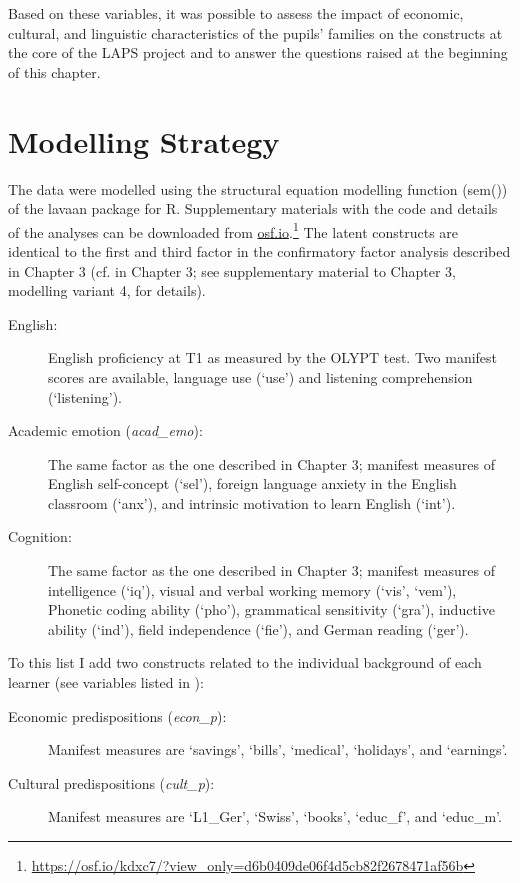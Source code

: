 \documentclass[output=paper]{langsci/langscibook}
\begin{document}
Based on these variables, it was possible to assess the impact of economic, cultural, and linguistic characteristics of the pupils’ families on the constructs at the core of the LAPS project and to answer the questions raised at the beginning of this chapter. 

\section{Modelling Strategy}

The data were modelled using the structural equation modelling function (sem()) of the lavaan package \citep{Rosseel2012} for R. Supplementary materials with the code and details of the analyses can be downloaded from \url{osf.io}.\footnote{\url{https://osf.io/kdxc7/?view_only=d6b0409de06f4d5cb82f2678471af56b}} The latent constructs are identical to the first and third factor in the confirmatory factor analysis described in Chapter 3 (cf.  in Chapter 3; see supplementary material to Chapter 3, modelling variant 4, for details). 

\begin{description}
\item[English:] English proficiency at T1 as measured by the OLYPT test. Two manifest scores are available, language use (‘use’) and listening comprehension (‘listening’).
\item[Academic emotion (\textit{acad\_emo}):] The same factor as the one described in Chapter 3; manifest measures of English self-concept (‘sel’), foreign language anxiety in the English classroom (‘anx’), and intrinsic motivation to learn English (‘int’).
\item[Cognition:] The same factor as the one described in Chapter 3; manifest measures of intelligence (‘iq’), visual and verbal working memory (‘vis’, ‘vem’), Phonetic coding ability (‘pho’), grammatical sensitivity (‘gra’), inductive ability (‘ind’), field independence (‘fie’), and German reading (‘ger’).
\end{description}

To this list I add two constructs related to the individual background of each learner (see variables listed in ):

\begin{description}
\item[Economic predispositions (\textit{econ\_p}):] Manifest measures are ‘savings’, ‘bills’, ‘medical’, ‘holidays’, and ‘earnings’.
\item[Cultural predispositions (\textit{cult\_p}):] Manifest measures are ‘L1\_Ger’, ‘Swiss’, ‘books’, ‘educ\_f’, and ‘educ\_m’.
\end{description}
\end{document}
